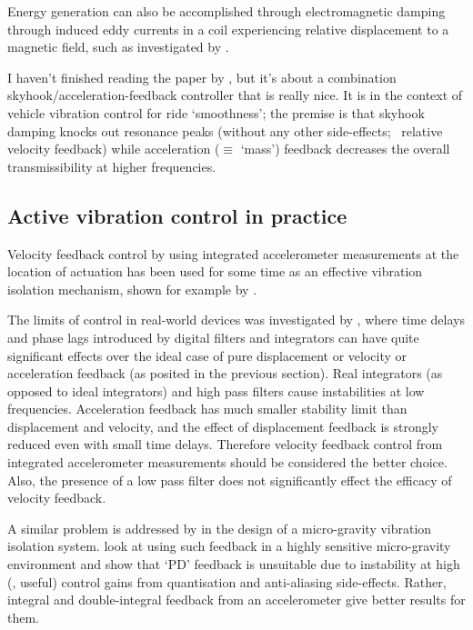 Energy generation can also be accomplished through electromagnetic damping through induced eddy currents in a coil experiencing relative displacement to a magnetic field, such as investigated by \textcite{graves2000}.

I haven't finished reading the paper by \textcite{savaresi2007}, but it's about a combination skyhook/acceleration-feedback controller that is really nice.
It is in the context of vehicle vibration control for ride `smoothness'; the premise is that skyhook damping knocks out resonance peaks (without any other side-effects; \cf\ relative velocity feedback) while acceleration ($\equiv$ `mass') feedback decreases the overall transmissibility at higher frequencies.



\subsection{Active vibration control in practice}

Velocity feedback control by using integrated accelerometer measurements at the location of actuation has been used for some time as an effective vibration isolation mechanism, shown for example by \textcite{kim1999}.

The limits of control in real-world devices was investigated by \textcite{ananthaganeshan2001}, where time delays and phase lags introduced by digital filters and integrators can have quite significant effects over the ideal case of pure displacement or velocity or acceleration feedback (as posited in the previous section).
Real integrators (as opposed to ideal integrators) and high pass filters cause instabilities at low frequencies.
Acceleration feedback has much smaller stability limit than displacement and velocity, and the effect of displacement feedback is strongly reduced even with small time delays.
Therefore velocity feedback control from integrated accelerometer measurements should be considered the better choice.
Also, the presence of a low pass filter does not significantly effect the efficacy of velocity feedback.

A similar problem is addressed by \textcite{zhu2006} in the design of a micro-gravity vibration isolation system. look at using such feedback in a highly sensitive micro-gravity environment and show that `PD' feedback is unsuitable due to instability at high (\ie, useful) control gains from quantisation and anti-aliasing side-effects.
Rather, integral and double-integral feedback from an accelerometer give better results for them.

